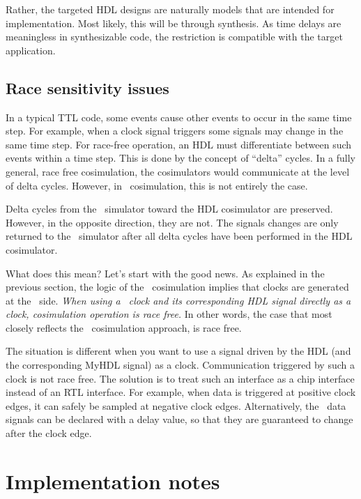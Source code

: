 Rather, the targeted HDL designs are naturally models that are
intended for implementation.  Most likely, this will be through
synthesis. As time delays are meaningless in synthesizable code, the
restriction is compatible with the target application.

\subsection{Race sensitivity issues}

In a typical TTL code, some events cause other events to occur in the
same time step. For example, when a clock signal triggers some signals
may change in the same time step. For race-free operation, an HDL
must differentiate between such events within a time step. This is done
by the concept of ``delta'' cycles. In a fully general, race free
cosimulation, the cosimulators would communicate at the level of delta
cycles. However, in \myhdl\ cosimulation, this is not entirely the
case.

Delta cycles from the \myhdl\ simulator toward the HDL cosimulator are
preserved. However, in the opposite direction, they are not. The
signals changes are only returned to the \myhdl\ simulator after all delta
cycles have been performed in the HDL cosimulator.

What does this mean? Let's start with the good news. As explained in
the previous section, the logic of the \myhdl\ cosimulation implies
that clocks are generated at the \myhdl\ side.  \emph{When using a
\myhdl\ clock and its corresponding HDL signal directly as a clock,
cosimulation operation is race free.} In other words, the case
that most closely reflects the \myhdl\ cosimulation approach, is race free.

The situation is different when you want to use a signal driven by the
HDL (and the corresponding MyHDL signal) as a clock. 
Communication triggered by such a clock is not race free. The solution
is to treat such an interface as a chip interface instead of an RTL
interface.  For example, when data is triggered at positive clock
edges, it can safely be sampled at negative clock edges.
Alternatively, the \myhdl\ data signals can be declared with a delay
value, so that they are guaranteed to change after the clock
edge.


\section{Implementation notes}

